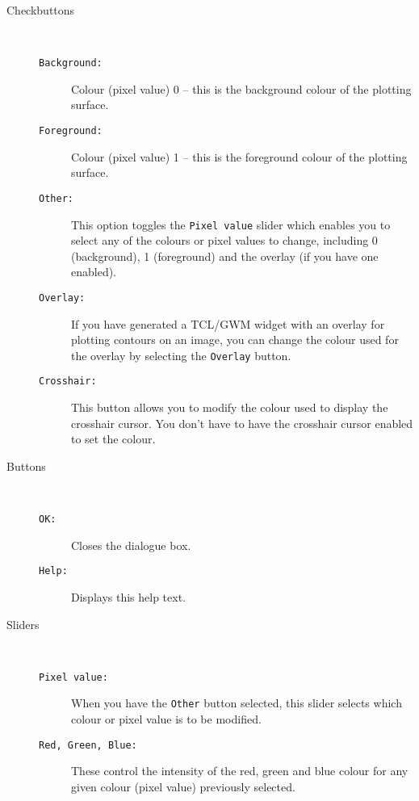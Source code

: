 \begin{description}

\item[Checkbuttons]~

\begin{description}

\item[{\tt{Background:}}] Colour (pixel value) 0 -- this is the
background colour of the plotting surface.

\item[{\tt{Foreground:}}] Colour (pixel value) 1 -- this is the
foreground colour of the plotting surface.

\item[{\tt{Other:}}] This option toggles the {\tt{Pixel~value}} slider which
enables you to select any of the colours or pixel values to change,
including 0 (background), 1 (foreground) and the overlay (if you have
one enabled).

\item[{\tt{Overlay:}}] If you have generated a TCL/GWM widget with an
overlay for plotting contours on an image, you can change the colour
used for the overlay by selecting the {\tt{Overlay}} button.

\item[{\tt{Crosshair:}}] This button allows you to modify the colour
used to display the crosshair cursor.  You don't have to have the
crosshair cursor enabled to set the colour.

\end{description}

\item[Buttons]~

\begin{description}

\item[{\tt{OK:}}] Closes the {} dialogue box.

\item[{\tt{Help:}}] Displays this help text.

\end{description}

\item[Sliders]~

\begin{description}

\item[{\tt{Pixel~value:}}] When you have the {\tt{Other}} button selected,
this slider selects which colour or pixel value is to be modified.

\item[{\tt{Red, Green, Blue:}}] These control the intensity of the red,
green and blue colour for any given colour (pixel value) previously
selected.

\end{description}

\end{description}

